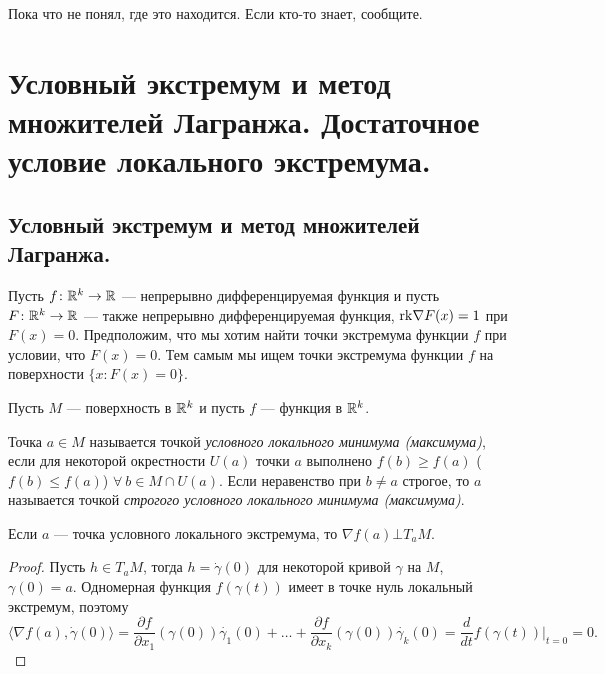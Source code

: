 \documentclass[a4paper]{article}
\theoremstyle{named}
\begin{document}
    Пока что не понял, где это находится. Если кто-то знает, сообщите.

    \section{Условный экстремум и метод множителей Лагранжа. Достаточное условие локального экстремума.}

    \subsection{Условный экстремум и метод множителей Лагранжа.}

    Пусть $f\colon \mathbb{R}^k\to \mathbb{R}$ --- непрерывно дифференцируемая функция и пусть $F\colon \mathbb{R}^k\to \mathbb{R}$ --- также непрерывно дифференцируемая функция,
    ${\rm rk}\nabla F(x)=1$ при $F(x)=0$.
    Предположим, что мы хотим найти точки экстремума функции $f$ при условии, что $F(x)=0$. Тем самым мы ищем точки экстремума функции $f$ на поверхности $\{x\colon F(x)=0\}$.
    
    \begin{definition*}
        Пусть $M$ --- поверхность в $\mathbb{R}^k$	и пусть $f$ --- функция в $\mathbb{R}^k$. 
    
        Точка $a\in M$ называется точкой {\it условного локального минимума (максимума)}, если для некоторой окрестности $U(a)$ точки $a$
        выполнено $f(b)\ge f(a)$ ($f(b)\leq f(a)$) $\forall\ b\in M\cap U(a)$. Если неравенство при $b\ne a$ строгое, то $a$ называется точкой {\it строгого условного локального минимума (максимума)}.
    \end{definition*}
    
    \begin{proposal*}
        Если $a$ --- точка условного локального экстремума, то $\nabla f(a)\bot T_aM$.
    \end{proposal*}
    
    \begin{proof}
        Пусть $h\in T_aM$, тогда $h=\dot{\gamma}(0)$ для некоторой кривой $\gamma$ на $M$, $\gamma(0)=a$.
        Одномерная функция $f(\gamma(t))$ имеет в точке нуль локальный экстремум, поэтому
        $$
            \langle\nabla f(a), \dot{\gamma}(0)\rangle =
            \dfrac{\partial f}{\partial x_1}(\gamma(0))\dot{\gamma_1}(0)+\ldots+
            \dfrac{\partial f}{\partial x_k}(\gamma(0))\dot{\gamma_k}(0)=
            \dfrac{d}{dt}f(\gamma(t))\bigl|_{t=0}=0.
        $$
    \end{proof}
    
\end{document}
